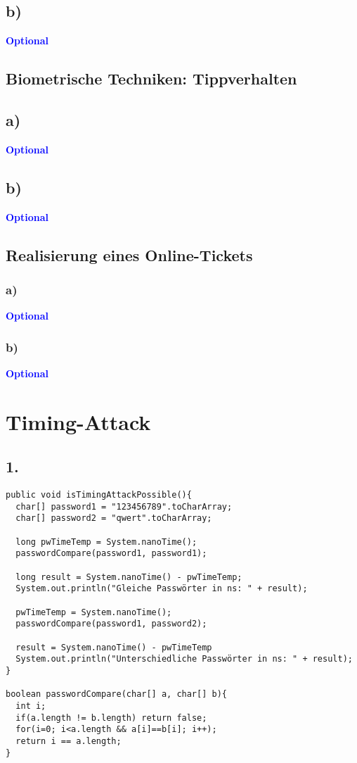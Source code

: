 \documentclass[a4paper,11pt]{scrartcl}
\newcommand{\opt}{\textcolor{blue}{\textbf{Optional}}}
\begin{document}
\subsection*{b)} \opt

\subsection{Biometrische Techniken: Tippverhalten}
\subsection*{a)} \opt
\subsection*{b)} \opt

\subsection{Realisierung eines Online-Tickets}
\subsubsection*{a)} \opt
\subsubsection*{b)} \opt

\section{\textbf{Timing-Attack}}
\subsection*{1.} 
\begin{verbatim}
public void isTimingAttackPossible(){
  char[] password1 = "123456789".toCharArray;
  char[] password2 = "qwert".toCharArray;

  long pwTimeTemp = System.nanoTime();
  passwordCompare(password1, password1);
  
  long result = System.nanoTime() - pwTimeTemp;
  System.out.println("Gleiche Passwörter in ns: " + result);

  pwTimeTemp = System.nanoTime();
  passwordCompare(password1, password2);
  
  result = System.nanoTime() - pwTimeTemp
  System.out.println("Unterschiedliche Passwörter in ns: " + result);
}

boolean passwordCompare(char[] a, char[] b){
  int i;
  if(a.length != b.length) return false;
  for(i=0; i<a.length && a[i]==b[i]; i++);
  return i == a.length;
}
\end{verbatim}
\end{document}
